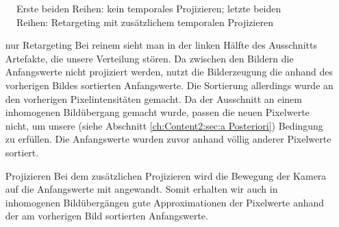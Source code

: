 \begin{figure}[H]
\begin{tcolorbox}[boxrule=4pt,sharp corners=downhill,title=Szene unter Kamerabewegung, fonttitle=\bfseries]
\begin{subfigure}[b]{0.2\linewidth}
         \caption{}
         \label{pic:TemporalRepr_4}
    \end{subfigure}
  \end{tcolorbox}
    \caption{Erste beiden Reihen: kein temporales Projizieren; letzte beiden Reihen: Retargeting mit zusätzlichem temporalen Projizieren}
    \label{fig:Auswirkung temporales Projizieren}
\end{figure}

\begin{itemize}
  \item[nur Retargeting] Bei reinem  sieht man in der linken Hälfte des Ausschnitts Artefakte, die unsere 
                          Verteilung stören. Da zwischen den Bildern die Anfangswerte nicht projiziert
                         werden, nutzt die Bilderzeugung die anhand des vorherigen Bildes sortierten Anfangswerte. Die Sortierung allerdings
                         wurde an den vorherigen Pixelintensitäten gemacht. Da der Ausschnitt an einem inhomogenen Bildübergang gemacht wurde,
                         passen die neuen Pixelwerte nicht, um unsere (siehe Abschnitt \ref{ch:Content2:sec:a Posteriori})
                         Bedingung zu erfüllen. Die Anfangswerte wurden zuvor anhand völlig anderer Pixelwerte sortiert. 

  \item[Projizieren] Bei dem zusätzlichen Projizieren wird die Bewegung der Kamera auf die Anfangswerte mit angewandt. Somit erhalten wir auch in 
                      inhomogenen Bildübergängen gute Approximationen der Pixelwerte anhand der am vorherigen Bild sortierten Anfangswerte. 
\end{itemize}

